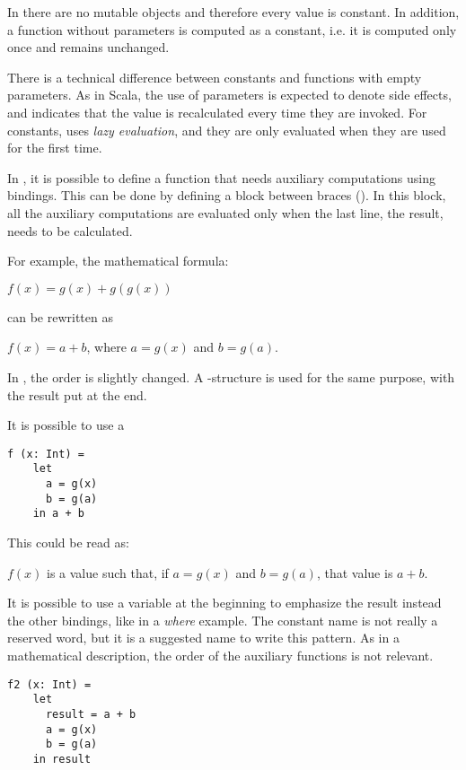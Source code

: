 In \Soda there are no mutable objects and therefore every value is constant.
In addition, a function without parameters is computed as a constant, i.e. it is computed only once and remains unchanged.

There is a technical difference between constants and functions with empty parameters.
As in Scala, the use of parameters is expected to denote side effects, and indicates that the value is recalculated every time they are invoked.
For constants, \Soda uses \textit{lazy evaluation}, and they are only evaluated when they are used for the first time.

In \Soda, it is possible to define a function that needs auxiliary computations using bindings.
This can be done by defining a block between braces (\srccode{\{ \}}).
In this block, all the auxiliary computations are evaluated only when the last line, the result, needs to be calculated.

For example, the mathematical formula:
\begin{center}
    $f(x) = g(x) + g(g(x))$
\end{center}
can be rewritten as
\begin{center}
    $f(x) = a + b$, where $a = g(x)$ and $b = g(a)$.
\end{center}

In \Soda, the order is slightly changed.
A \sodalet-\sodain structure is used for the same purpose, with the result put at the end.

It is possible to use a
\begin{lstlisting}[label={lst:exampleFunctionWithLetIn}]
  f (x: Int) =
    let
      a = g(x)
      b = g(a)
    in a + b
\end{lstlisting}

This could be read as:
\begin{center}
    $f(x)$ is a value such that, if $a = g(x)$ and $b = g(a)$, that value is $a + b$.
\end{center}

It is possible to use a variable at the beginning to emphasize the result instead the other bindings, like in a \textit{where} example.
The constant name  is not really a reserved word, but it is a suggested name to write this pattern.
As in a mathematical description, the order of the auxiliary functions is not relevant.

\begin{lstlisting}[label={lst:exampleFunctionLikeWhere}]
  f2 (x: Int) =
    let
      result = a + b
      a = g(x)
      b = g(a)
    in result
\end{lstlisting}


